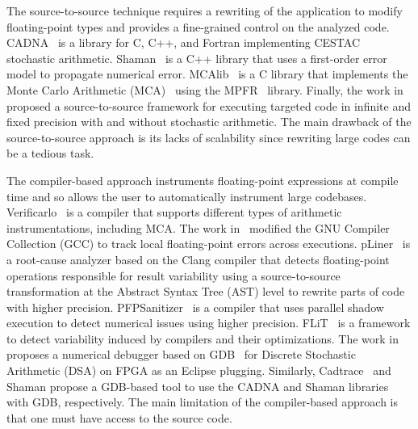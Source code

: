 \documentclass[11pt]{article}
\newcommand{\gkmod}[2]{\color{purple}\sout{#1} #2\color{black}\xspace}
\begin{document}
The source-to-source technique requires a rewriting of the application to modify floating-point types and provides a fine-grained control on the analyzed code.
CADNA~\cite{jezequel2008cadna} is a library for C, C++, and Fortran implementing  
CESTAC~\cite{vignes1993stochastic} stochastic arithmetic. Shaman~\cite{demeure_phd} is a C++ library that uses a first-order error model to propagate numerical error. 
MCAlib~\cite{frechtling2015mcalib} is a C library that implements the Monte Carlo Arithmetic (MCA)~\cite{parker1997monte} using the MPFR~\cite{fousse2007mpfr} library.
Finally, the work in~\cite{tang2016software} proposed a source-to-source framework for executing targeted code in infinite and fixed precision with and without stochastic arithmetic. The main drawback of the source-to-source approach is its lacks of scalability since rewriting large codes can be a tedious task.
 

The compiler-based approach instruments floating-point expressions at compile time
and so allows the user to automatically instrument large codebases.
Verificarlo~\cite{verificarlo} is a compiler that supports different types of arithmetic instrumentations, including MCA. 
The work in~\cite{bao2013fly} modified the GNU Compiler Collection (GCC) to track local floating-point errors across executions. pLiner~\cite{guo2020pliner} is a root-cause analyzer based on the Clang compiler that detects floating-point operations responsible for result variability using a source-to-source transformation at the Abstract Syntax Tree (AST) level to rewrite parts of code with higher precision. 
PFPSanitizer~\cite{chowdhary2020debugging,chowdhary2021parallel} is a compiler that uses parallel shadow execution to detect numerical issues using higher precision.
FLiT~\cite{sawaya2017flit} is a framework to detect variability induced by compilers and their optimizations.
The work in~\cite{wang2012development} proposes a numerical debugger based on GDB~\cite{stallman1988debugging} for Discrete Stochastic Arithmetic (DSA) on FPGA as an Eclipse plugging. Similarly, Cadtrace~\cite{jezequel2008cadna} and Shaman propose a GDB-based tool to use the CADNA and Shaman libraries with GDB, respectively.
The main limitation of the compiler-based approach is that one must have access to the source code.
\end{document}
